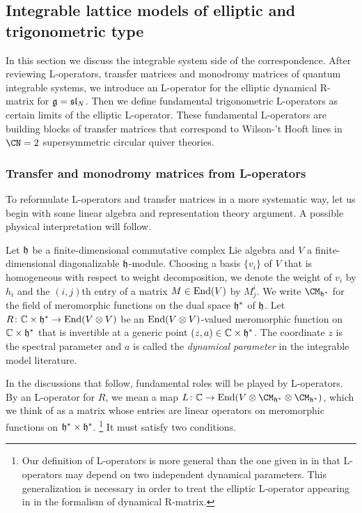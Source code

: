 \subsection{Integrable lattice models of elliptic and trigonometric type}
\label{sec:QIS}

In this section we discuss the integrable system side of the
correspondence.  After reviewing L-operators, transfer matrices and
monodromy matrices of quantum integrable systems, we introduce an
L-operator for the elliptic dynamical R-matrix for $\mathfrak{g}=\mathfrak{sl}_N$.
Then we define
fundamental trigonometric L-operators as certain limits of the
elliptic L-operator.  These fundamental L-operators are building
blocks of transfer matrices that correspond to Wilson-'t Hooft lines
in $\CN = 2$ supersymmetric circular quiver theories.






\subsubsection{Transfer and monodromy matrices from L-operators}

To reformulate L-operators and transfer matrices in a more systematic
way, let us begin with some linear algebra and representation theory
argument. A possible physical interpretation will follow.


Let $\mathfrak{h}$ be a finite-dimensional commutative complex Lie algebra and
$V$ a finite-dimensional diagonalizable $\mathfrak{h}$-module.  Choosing a
basis $\{v_i\}$ of $V$ that is homogeneous with respect to weight
decomposition, we denote the weight of $v_i$ by $h_i$ and the
$(i,j)$th entry of a matrix $M \in \mathop{\mathrm{End}}\nolimits(V)$ by $M^i_j$.  We write
$\CM_{\hf^*}$ for the field of meromorphic functions on the dual
space $\mathfrak{h}^*$ of $\mathfrak{h}$.
Let $R\colon \mathbb{C} \times \mathfrak{h}^* \to \mathop{\mathrm{End}}\nolimits(V \otimes V)$ be an
$\mathop{\mathrm{End}}\nolimits(V \otimes V)$-valued meromorphic function on
$\mathbb{C} \times \mathfrak{h}^*$ that is invertible at a generic point
$(z,a) \in \mathbb{C} \times \mathfrak{h}^*$.  The coordinate $z$ is
the spectral parameter and $a$ is called the
\emph{dynamical parameter} in the integrable model literature.

In the discussions that follow, fundamental roles will be played by
L-operators.  By an L-operator for $R$, we mean a map
$L\colon \C \to \End(V \otimes \CM_{\hf^*} \otimes
\CM_{\hf^*})$, which we think of as a matrix whose entries are
linear operators on meromorphic functions on
$\mathfrak{h}^* \times \mathfrak{h}^*$.%
%
\footnote{Our definition of L-operators is more general than
the one given in \cite{MR1645196} in that L-operators may depend on two independent dynamical parameters.
This generalization is necessary in order to treat the elliptic L-operator appearing in
\cite{MR1463830} in the formalism of dynamical R-matrix.}
%
It must satisfy two conditions.

